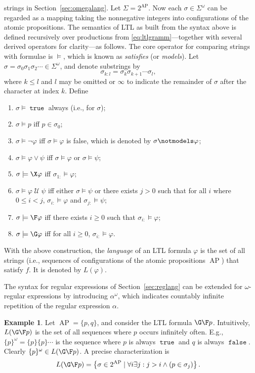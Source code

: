 \documentclass{amsart}
\DeclareMathOperator{\U}{\mathcal{U}}
\DeclareMathOperator{\ap}{AP}
\DeclareMathOperator{\true}{\mathtt{true}}
\DeclareMathOperator{\false}{\mathtt{false}}
\theoremstyle{plain}
\theoremstyle{definition}
\theoremstyle{definition}
\newtheorem{examp}{Example}
\begin{document}
strings in Section~\ref{sec:omegalang}.  Let $\Sigma=2^{\ap}$.  Now each
$\sigma\in \Sigma^{\omega}$ can be regarded as a mapping taking the nonnegative
integers into configurations of the atomic propositions.  The semantics of LTL
as built from the syntax above is defined recursively over productions from
\eqref{eq:ltlgramm}---together with several derived operators for clarity---as
follows.  The core operator for comparing strings with formulae is $\models$,
which is known as \textit{satisfies} (or \textit{models}).  Let $\sigma=\sigma_0
\sigma_1 \sigma_2 \cdots \in \Sigma^{\omega}$, and denote substrings by
\[
\sigma_{k:l} = \sigma_{k}\sigma_{k+1}\cdots\sigma_{l} ,
\]
where $k\leq l$ and $l$ may be omitted or $\infty$ to indicate the remainder of
$\sigma$ after the character at index $k$.  Define
\begin{enumerate}
\item $\sigma \models \true$ always (i.e., for $\sigma$);
\item $\sigma \models p$ iff $p\in \sigma_0$;
\item $\sigma \models \neg \varphi$ iff $\sigma\models\varphi$ is false, which is denoted by $\sigma \notmodels \varphi$;
\item $\sigma \models \varphi \vee \psi$ iff $\sigma \models \varphi$ or $\sigma \models \psi$;
\item $\sigma \models \X \varphi$ iff $\sigma_{1:} \models \varphi$;
\item $\sigma \models \varphi\U \psi$ iff either $\sigma\models\psi$ or there exists $j > 0$ such that for all $i$ where $0\leq i<j$, $\sigma_{i:}\models \varphi$ and $\sigma_{j:}\models \psi$;
\item $\sigma \models \F \varphi$ iff there exists $i\geq0$ such that $\sigma_{i:}\models \varphi$;
\item $\sigma \models \G \varphi$ iff for all $i\geq0$, $\sigma_{i:}\models \varphi$.
\end{enumerate}
With the above construction, the \textit{language} of an LTL formula $\varphi$
is the set of all strings (i.e., sequences of configurations of the atomic
propositions $\ap$) that satisfy $f$.  It is denoted by $L(\varphi)$.

The syntax for regular expressions of Section~\ref{sec:reglang} can be extended
for $\omega$-regular expressions by introducing $\alpha^{\omega}$, which
indicates countably infinite repetition of the regular expression $\alpha$.
\begin{examp}
Let $\ap=\{ p, q\}$, and consider the LTL formula $\G\F p$.  Intuitively,
$L(\G\F p)$ is the set of all sequences where $p$ occurs infinitely often.
E.g., $\{p\}^{\omega}=\{p\}\{p\}\cdots$ is the sequence where $p$ is always
$\true$ and $q$ is always $\false$.  Clearly $\{p\}^{\omega}\in L(\G\F p)$.
A precise characterization is
\[
L(\G\F p) = \left\{ \sigma\in 2^{\ap} \mid \forall i \exists j : j > i \wedge \left( p\in\sigma_j \right) \right\} .
\]
\end{examp}
\end{document}
